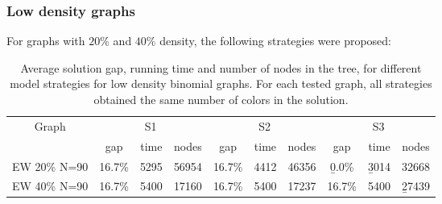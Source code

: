 \subsubsection*{Low density graphs}

For graphs with $20\%$ and $40\%$ density, the following strategies were proposed:

\begin{itemize}
\end{itemize}

\begin{table}
\begin{tabular}{|c|ccc|ccc|ccc|}
\hline
\multicolumn{1}{|c|}{Graph} & \multicolumn{3}{|c|}{S1} & \multicolumn{3}{|c|}{S2} & \multicolumn{3}{|c|}{S3}
\\
 & gap & time & nodes & gap & time & nodes & gap & time & nodes 
\\
\hline
EW 20\% N=90 & 16.7\% & 5295 & 56954 & 16.7\% & 4412 & 46356 & \b{0.0\%} & \b{3014} & 32668
\\
EW 40\% N=90 & 16.7\% & 5400 & 17160 & 16.7\% & 5400 & 17237 & 16.7\% & 5400 & \b{27439}
\\
\hline 
 \end{tabular}
 \caption{Average solution gap, running time and number of nodes in the tree, for different model strategies for low density binomial graphs. For each tested graph, all strategies obtained the same number of colors in the solution.}
\label{table:bnc:modellow}
\end{table}

